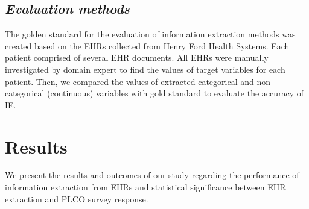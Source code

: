 \documentclass{amia}
\begin{document}
\subsection*{\textit{Evaluation methods}}
The golden standard for the evaluation of information extraction methods was created based on the EHRs collected from Henry Ford Health Systems. Each patient comprised of several EHR documents. All EHRs were manually investigated by domain expert to find the values of target variables for each patient. Then, we compared the values of extracted categorical and non-categorical (continuous) variables with gold standard to evaluate the accuracy of IE. 

\section*{Results}
We present the results and outcomes of our study regarding the performance of information extraction from EHRs and statistical significance between EHR extraction and PLCO survey response. \\

\end{document}
